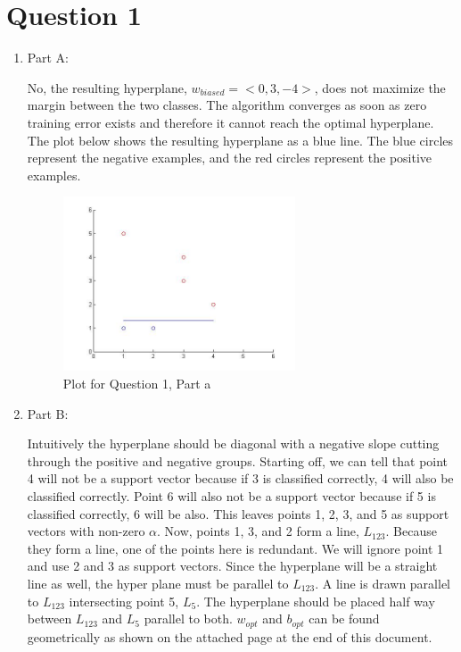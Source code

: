 \documentclass[12pt]{article}
\begin{document}
\maketitle


\section{Question 1}
\begin{enumerate}
\item Part A:

No, the resulting hyperplane, $w_{biased} = <0, 3, -4>$, does not maximize the margin between the two classes. The algorithm converges as soon as zero training error exists and therefore it cannot reach the optimal hyperplane. The plot below shows the resulting hyperplane as a blue line. The blue circles represent the negative examples, and the red circles represent the positive examples.

\begin{figure}[h!]
  \caption{Plot for Question 1, Part a}
  \centering
    \includegraphics[width=0.65\textwidth]{hw3_1a}
\end{figure}

\item Part B:

Intuitively the hyperplane should be diagonal with a negative slope cutting through the positive and negative groups. Starting off, we can tell that point 4 will not be a support vector because if 3 is classified correctly, 4 will also be classified correctly. Point 6 will also not be a support vector because if 5 is classified correctly, 6 will be also. This leaves points 1, 2, 3, and 5 as support vectors with non-zero $\alpha$. Now, points 1, 3, and 2 form a line, $L_{123}$. Because they form a line, one of the points here is redundant. We will ignore point 1 and use 2 and 3 as support vectors. Since the hyperplane will be a straight line as well, the hyper plane must be parallel to $L_{123}$. A line is drawn parallel to $L_{123}$ intersecting point 5, $L_5$. The hyperplane should be placed half way between $L_{123}$ and $L_{5}$ parallel to both. $w_{opt}$ and $b_{opt}$ can be found geometrically as shown on the attached page at the end of this document.  


\end{enumerate}
\end{document}
